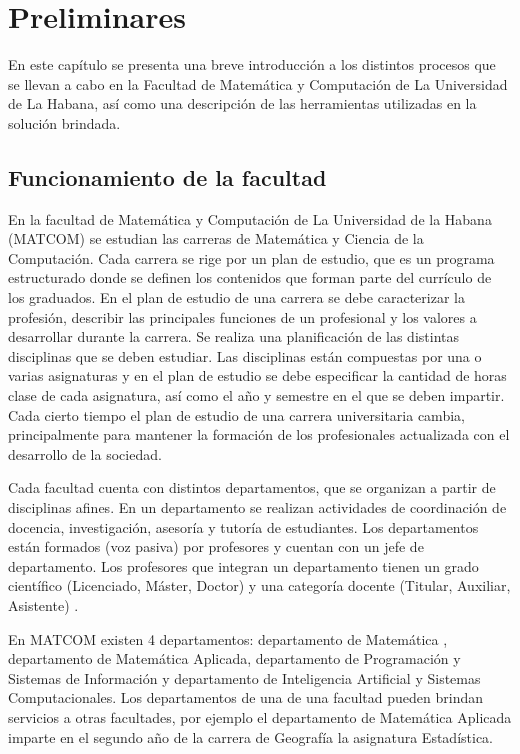 \chapter{Preliminares}\label{chapter:preliminaries}
En este capítulo se presenta una breve introducción a los distintos 
procesos que se llevan a cabo en la Facultad
de Matemática y Computación de La Universidad de La Habana, así
como una descripción de las herramientas utilizadas en la 
solución brindada. 

\section{Funcionamiento de la facultad}\label{section:funcionamiento de la facultad}
En la facultad de Matemática y Computación de La Universidad de la 
Habana (MATCOM) se estudian las carreras de Matemática y Ciencia de la Computación. 
Cada carrera se rige por un plan de estudio, que es un programa estructurado
donde se definen los contenidos que forman parte del currículo de los 
graduados. En el plan de estudio de una carrera 
se debe caracterizar la profesión, describir las principales funciones de un profesional y 
los valores a desarrollar durante la carrera. 
Se realiza una planificación de las distintas 
disciplinas que se deben estudiar. Las disciplinas están compuestas por una o varias 
asignaturas y en el plan de estudio se debe especificar la cantidad de horas clase de 
cada asignatura, así como el año y semestre en el que se deben impartir.
Cada cierto tiempo el plan de estudio de una carrera universitaria cambia, principalmente
para mantener la formación de los profesionales actualizada con el desarrollo de la 
sociedad. 

Cada facultad cuenta con distintos departamentos, que se organizan a partir de disciplinas afines.
En un departamento se realizan actividades de coordinación de docencia, investigación, asesoría y 
tutoría de estudiantes. Los departamentos están formados (voz pasiva) por profesores
y cuentan con un jefe de departamento. Los profesores que integran un departamento tienen 
un grado científico (Licenciado, Máster, Doctor) y una categoría docente (Titular, Auxiliar, Asistente) .


En MATCOM existen 4 departamentos: departamento de Matemática
, departamento de Matemática Aplicada,
departamento de Programación y Sistemas de Información y departamento de Inteligencia 
Artificial y Sistemas Computacionales. Los departamentos de una 
de una facultad pueden brindan servicios a otras facultades, por ejemplo el departamento de 
Matemática Aplicada imparte en el segundo año de la carrera de Geografía la asignatura 
Estadística.

